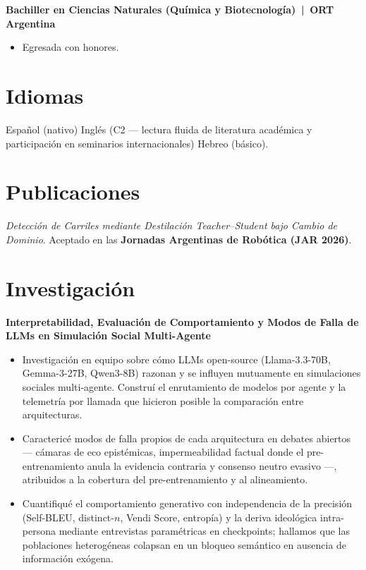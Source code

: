 \documentclass[a4paper,11pt]{article}
\begin{document}
\textbf{Bachiller en Ciencias Naturales (Química y Biotecnología) \,|\, ORT Argentina}
\begin{itemize}
    \item Egresada con honores.
\end{itemize}

\section*{Idiomas}

Español (nativo) \textbullet{} Inglés (C2 --- lectura fluida de literatura académica y participación en seminarios internacionales) \textbullet{} Hebreo (básico).

\section*{Publicaciones}

\emph{Detección de Carriles mediante Destilación Teacher--Student bajo Cambio de Dominio}. Aceptado en las \textbf{Jornadas Argentinas de Robótica (JAR 2026)}.

\section*{Investigación}

\textbf{Interpretabilidad, Evaluación de Comportamiento y Modos de Falla de LLMs en Simulación Social Multi-Agente}
\begin{itemize}
    \item Investigación en equipo sobre cómo LLMs open-source (Llama-3.3-70B, Gemma-3-27B, Qwen3-8B) razonan y se influyen mutuamente en simulaciones sociales multi-agente. Construí el enrutamiento de modelos por agente y la telemetría por llamada que hicieron posible la comparación entre arquitecturas.
    \item Caractericé modos de falla propios de cada arquitectura en debates abiertos --- cámaras de eco epistémicas, impermeabilidad factual donde el pre-entrenamiento anula la evidencia contraria y consenso neutro evasivo ---, atribuidos a la cobertura del pre-entrenamiento y al alineamiento.
    \item Cuantifiqué el comportamiento generativo con independencia de la precisión (Self-BLEU, distinct-$n$, Vendi Score, entropía) y la deriva ideológica intra-persona mediante entrevistas paramétricas en checkpoints; hallamos que las poblaciones heterogéneas colapsan en un bloqueo semántico en ausencia de información exógena.
\end{itemize}
\end{document}
